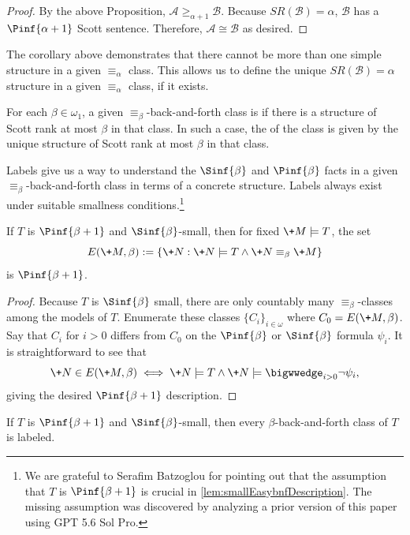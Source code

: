 \documentclass[10pt,a4paper]{amsart}
\renewcommand{\-}{\text{-}}
\begin{document}
\begin{proof}
    By the above Proposition, $\mathcal{A}\geq_{\alpha+1}\mathcal{B}$.
    Because $SR(\mathcal{B})=\alpha$, $\mathcal{B}$ has a $\Pinf{\alpha+1}$ Scott sentence.
    Therefore, $\mathcal{A}\cong\mathcal{B}$ as desired.
\end{proof}

The corollary above demonstrates that there cannot be more than one simple structure in a given $\equiv_{\alpha}$ class.
This allows us to define the unique $SR(\mathcal{B})=\alpha$ structure in a given $\equiv_{\alpha}$ class, if it exists.

\begin{definition}
For each $\beta\in\omega_1$, a given $\equiv_\beta$-back-and-forth class is  if there is a structure of Scott rank at most $\beta$ in that class.
In such a case, the  of the class is given by the unique structure of Scott rank at most $\beta$ in that class.
\end{definition}

Labels give us a way to understand the $\Sinf{\beta}$ and $\Pinf{\beta}$ facts in a given $\equiv_\beta$-back-and-forth class in terms of a concrete structure.
Labels always exist under suitable smallness conditions.\footnote{We are grateful to Serafim Batzoglou for pointing out that the assumption that $T$ is $\Pinf{\beta+1}$ is crucial in \cref{lem:smallEasybnfDescription}. The missing assumption was discovered by analyzing a prior version of this paper using GPT 5.6 Sol Pro.}

\begin{lemma}\label{lem:smallEasybnfDescription}
  If $T$ is $\Pinf{\beta+1}$  and $\Sinf{\beta}$-small, then for fixed $\+M\models T$, the set
\[E(\+M,\beta):=\{\+N : \+N\models T \land \+N\equiv_\beta \+M\}\]
is $\Pinf{\beta+1}$.
\end{lemma}

\begin{proof}
Because $T$ is $\Sinf{\beta}$ small, there are only countably many $\equiv_\beta$-classes among the models of $T$.
Enumerate these classes $\{C_i\}_{i\in\omega}$ where $C_0= E(\+M,\beta)$.
Say that $C_i$ for $i>0$ differs from $C_0$ on the $\Pinf{\beta}$ or $\Sinf{\beta}$ formula $\psi_i$.
It is straightforward to see that
\[\+N\in E(\+M,\beta) \iff \+N\models T \land \+N\models\bigwwedge_{i>0} \lnot\psi_i,\]
giving the desired $\Pinf{\beta+1}$ description.
\end{proof}

\begin{corollary}\label{cor:allClassesLabeled}
  If $T$ is $\Pinf{\beta+1}$ and $\Sinf{\beta}$-small, then every $\beta$-back-and-forth class of $T$ is labeled.
\end{corollary}
\end{document}
